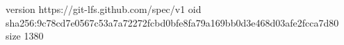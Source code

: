 version https://git-lfs.github.com/spec/v1
oid sha256:9c78cd7e0567c53a7a72272fcbd0bfe8fa79a169bb0d3e468d03afe2fcca7d80
size 1380
